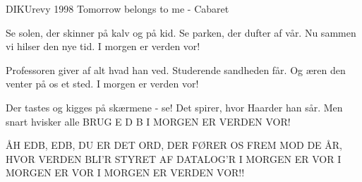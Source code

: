 {DIKUrevy 1998}
{Tomorrow belongs to me - Cabaret}
{
Se solen, der skinner
på kalv og på kid.
Se parken, der dufter af vår.
Nu sammen vi hilser
den nye tid.
I morgen er verden vor!

Professoren giver 
af alt hvad han ved.
Studerende sandheden får.
Og æren den venter
på os et sted.
I morgen er verden vor!

Der tastes og kigges
på skærmene - se!
Det spirer, hvor Haarder han sår.
Men snart hvisker alle
BRUG  E D B
I MORGEN ER VERDEN VOR!


ÅH EDB, EDB,
DU ER DET ORD,
DER FØRER OS FREM MOD DE ÅR,
HVOR VERDEN BLI'R STYRET AF DATALOG'R
I MORGEN ER VOR
I MORGEN ER VOR
I MORGEN ER VERDEN VOR!!
\\

}